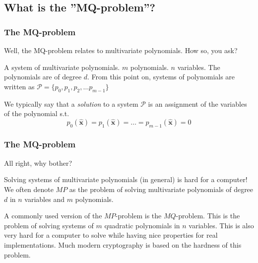 \documentclass{beamer}
\begin{document}
\subsection{What is the ''MQ-problem''?}
\begin{frame}
    \frametitle{The MQ-problem}
    Well, the MQ-problem relates to multivariate polynomials. How so, you ask?
    \pause
    \begin{outline}
        \1 A system of multivariate polynomials.
            \2 $m$ polynomials. 
            \2 $n$ variables.
            \2 The polynomials are of degree $d$.
            \2 From this point on, systems of polynomials are written as $\mathcal{P} = \{p_0, p_1, p_2, \dots p_{m-1}\}$
    \end{outline}

    \pause 

    We typically say that a \textit{solution} to a system $\mathcal{P}$ is an assignment of the variables of the polynomial s.t. 
    $$
        p_{0}(\hat{\mathbf{x}}) = p_{1}(\hat{\mathbf{x}}) = \dots = p_{m-1}(\hat{\mathbf{x}}) = 0
    $$
\end{frame}

\begin{frame}
    \frametitle{The MQ-problem}
    All right, why bother?
    \pause
    \begin{outline}
        \1 Solving systems of multivariate polynomials (in general) is hard for a computer!
            \2 We often denote $MP$ as the problem of solving multivariate polynomials of degree $d$ in $n$ variables and $m$ polynomials.

        \pause 

        \1 A commonly used version of the $MP$-problem is the $MQ$-problem.
            \2 This is the problem of solving systems of $m$ quadratic polynomials in $n$ variables.
            \2 This is also very hard for a computer to solve while having nice properties for real implementations.
            \2 Much modern cryptography is based on the hardness of this problem.
    \end{outline}
\end{frame}
\end{document}
